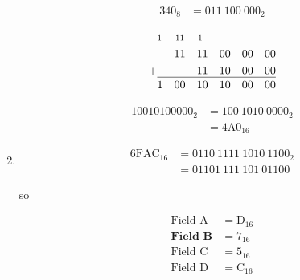 \documentclass[12pt,letterpaper,fleqn]{article}
\begin{document}
\begin{enumerate}
  \begin{align*}
    340_8 &= 011\ 100\ 000_2
  \end{align*}

  \begin{alignat*}{12}
    & \text{\scriptsize 1} & \text{\scriptsize 1} & \text{\scriptsize 1} & \text{\scriptsize 1} & & & & & & & \\
    & & 1 & 1 & 1 & 1 & 0 & 0 & 0 & 0 & 0 & 0 \\
    + & & & & 1 & 1 & 1 & 0 & 0 & 0 & 0 & 0 \\[-1.2em]
    \cline{2-12} \\[-2em]
    & 1 & 0 & 0 & 1 & 0 & 1 & 0 & 0 & 0 & 0 & 0
  \end{alignat*}

  \begin{align*}
    10010100000_2 &= 100\ 1010\ 0000_2 \\
    &= 4\text{A}0_{16}
  \end{align*}

\item \begin{align*}
  6\text{FAC}_{16} &= 0110\ 1111\ 1010\ 1100_2 \\
  &= 01101\ 111\ 101\ 01100
\end{align*}

  so

  \begin{align*}
    \text{Field A} &= \text{D}_{16} \\
    \textbf{Field B} &= 7_{16} \\
    \text{Field C} &= 5_{16} \\
    \text{Field D} &= \text{C}_{16}
  \end{align*}

\end{enumerate}
\end{document}
